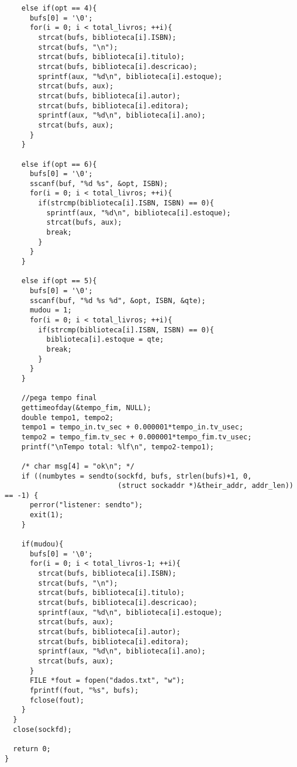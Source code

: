 \documentclass[11pt, brazil]{article} %
\begin{document}
\begin{verbatim}
    else if(opt == 4){
      bufs[0] = '\0';
      for(i = 0; i < total_livros; ++i){
        strcat(bufs, biblioteca[i].ISBN);
        strcat(bufs, "\n");
        strcat(bufs, biblioteca[i].titulo);
        strcat(bufs, biblioteca[i].descricao);
        sprintf(aux, "%d\n", biblioteca[i].estoque);
        strcat(bufs, aux);
        strcat(bufs, biblioteca[i].autor);
        strcat(bufs, biblioteca[i].editora);
        sprintf(aux, "%d\n", biblioteca[i].ano);
        strcat(bufs, aux);    				
      }
    }
		    	
    else if(opt == 6){
      bufs[0] = '\0';
      sscanf(buf, "%d %s", &opt, ISBN);
      for(i = 0; i < total_livros; ++i){
        if(strcmp(biblioteca[i].ISBN, ISBN) == 0){
          sprintf(aux, "%d\n", biblioteca[i].estoque);
          strcat(bufs, aux);
          break;
        }		    				
      }
    }
		    	
    else if(opt == 5){
      bufs[0] = '\0';
      sscanf(buf, "%d %s %d", &opt, ISBN, &qte);
      mudou = 1;
      for(i = 0; i < total_livros; ++i){
        if(strcmp(biblioteca[i].ISBN, ISBN) == 0){
          biblioteca[i].estoque = qte;
          break;
        }		    				
      }
    }
       
    //pega tempo final
    gettimeofday(&tempo_fim, NULL);
    double tempo1, tempo2;
    tempo1 = tempo_in.tv_sec + 0.000001*tempo_in.tv_usec;
    tempo2 = tempo_fim.tv_sec + 0.000001*tempo_fim.tv_usec;
    printf("\nTempo total: %lf\n", tempo2-tempo1);

    /* char msg[4] = "ok\n"; */
    if ((numbytes = sendto(sockfd, bufs, strlen(bufs)+1, 0,
                           (struct sockaddr *)&their_addr, addr_len)) == -1) {
      perror("listener: sendto");
      exit(1);
    }                                
				
    if(mudou){
      bufs[0] = '\0';
      for(i = 0; i < total_livros-1; ++i){
        strcat(bufs, biblioteca[i].ISBN);
        strcat(bufs, "\n");
        strcat(bufs, biblioteca[i].titulo);
        strcat(bufs, biblioteca[i].descricao);
        sprintf(aux, "%d\n", biblioteca[i].estoque);
        strcat(bufs, aux);
        strcat(bufs, biblioteca[i].autor);
        strcat(bufs, biblioteca[i].editora);
        sprintf(aux, "%d\n", biblioteca[i].ano);
        strcat(bufs, aux);			
      }
      FILE *fout = fopen("dados.txt", "w");
      fprintf(fout, "%s", bufs);
      fclose(fout);
    }
  }					
  close(sockfd);

  return 0;
}
\end{verbatim}
\end{document}
